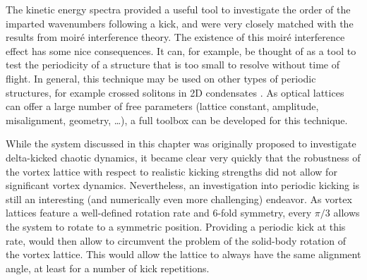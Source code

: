 The kinetic energy spectra provided a useful tool to investigate the order of the imparted wavenumbers following a kick, and were very closely matched with the results from moir\'e interference theory. The existence of this moir\'e interference effect has some nice consequences. It can, for example, be thought of as a tool to test the periodicity of a structure that is too small to resolve without time of flight. In general, this technique may be used on other types of periodic structures, for example crossed solitons in 2D condensates \cite{Tadhg_soliton}. As optical lattices can offer a large number of free parameters (lattice constant, amplitude, misalignment, geometry, \ldots), a full toolbox can be developed for this technique.

While the system discussed in this chapter was originally proposed to investigate delta-kicked chaotic dynamics, it became clear very quickly that the robustness of the vortex lattice with respect to realistic kicking strengths did not allow for significant vortex dynamics. Nevertheless, an investigation into periodic kicking is still an interesting (and numerically even more challenging) endeavor. As vortex lattices feature a well-defined rotation rate and 6-fold symmetry, every $\pi/3$ allows the system to rotate to a symmetric position. Providing a periodic kick at this rate, would then allow to circumvent the problem of the solid-body rotation of the vortex lattice. This would allow the lattice to always have the same alignment angle, at least for a number of kick repetitions.
